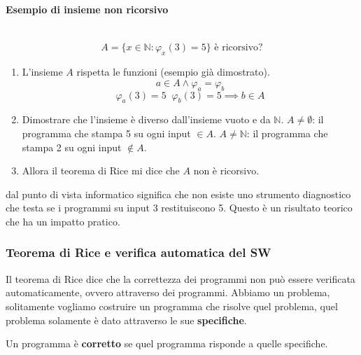 \documentclass{article}
\begin{document}
\paragraph{Esempio di insieme non ricorsivo}\mbox{}\\
$$A=\{x\in\mathbb{N}:\varphi_x(3)=5\}\text{ è ricorsivo?}$$

\begin{enumerate}
    \item L'insieme $A$ rispetta le funzioni (esempio già dimostrato).
          $$a\in A\land \varphi_a=\varphi_b$$
          $$\varphi_a(3)=5\;\;\varphi_b(3)=5\implies b\in A$$
    \item Dimostrare che l'insieme è diverso dall'insieme vuoto e da $\mathbb{N}$.
          $A\neq\emptyset$: il programma che stampa 5 su ogni input $\in A$.
          $A\neq\mathbb{N}$: il programma che stampa 2 su ogni input $\notin A$.
    \item Allora il teorema di Rice mi dice che $A$ non è ricorsivo.
\end{enumerate}
dal punto di vista informatico significa che non esiste uno strumento diagnostico
che testa se i programmi su input 3 restituiscono 5. Questo è un risultato teorico
che ha un impatto pratico.

\subsubsection{Teorema di Rice e verifica automatica del SW}
Il teorema di Rice dice che la correttezza dei programmi non può essere verificata
automaticamente, ovvero attraverso dei programmi. Abbiamo un problema, solitamente
vogliamo costruire un programma che risolve quel problema, quel problema solamente
è dato attraverso le sue \textbf{specifiche}.

Un programma è \textbf{corretto} se quel programma risponde a quelle specifiche.
\end{document}

